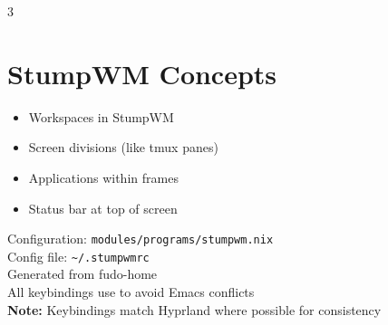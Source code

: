 \documentclass[10pt,landscape,a4paper]{article}
\newcommand{\key}[1]{%
  \tikz[baseline=(key.base)]{
    \node[
      rectangle,
      draw=headerblue,
      fill=keybg,
      inner sep=3pt,
      rounded corners=2pt,
      font=\ttfamily\small
    ] (key) {#1};
  }%
}
\begin{document}
\begin{multicols}{3}
	\section*{\textcolor{headerblue}{StumpWM Concepts}}
	\begin{itemize}[leftmargin=*,noitemsep]
		\item[\textcolor{desctext}{Groups:}] Workspaces in StumpWM
		\item[\textcolor{desctext}{Frames:}] Screen divisions (like tmux panes)
		\item[\textcolor{desctext}{Windows:}] Applications within frames
		\item[\textcolor{desctext}{Mode Line:}] Status bar at top of screen
	\end{itemize}

	\vfill

	\begin{center}
		\small\textcolor{desctext}{%
			Configuration: \texttt{modules/programs/stumpwm.nix}\\
			Config file: \texttt{\textasciitilde/.stumpwmrc}\\
			Generated from fudo-home\\
			All keybindings use \key{SUPER} to avoid Emacs conflicts\\[0.3em]
			\textbf{Note:} Keybindings match Hyprland where possible for consistency
		}
	\end{center}

\end{multicols}
\end{document}
